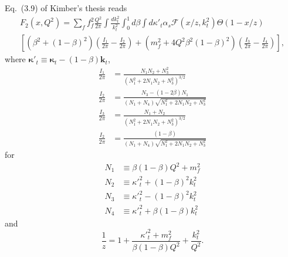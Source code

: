 \documentclass[12pt]{article}
\begin{document}
Eq.~(3.9) of Kimber's thesis reads
\begin{multline}
F_2(x,Q^2)=\sum_f f_f^2 \frac{Q^2}{2\pi}\int\frac{dk^2_t}{k_t^2}\int^1_0d\beta\int d{\kappa'}_t\alpha_s \mathcal{F}(x/z,k_t^2)\Theta(1-x/z)\\
\left[\left(\beta^2+(1-\beta)^2\right)\left(\frac{I_1}{2\pi}-\frac{I_2}{2\pi}\right)
+\left(m_f^2+4Q^2\beta^2(1-\beta)^2\right)\left(\frac{I_3}{2\pi}-\frac{I_4}{2\pi}\right)\right],
\label{eq:angle-integrated}
\end{multline}
where ${\boldsymbol{\kappa}'}_t\equiv{\boldsymbol{\kappa}_t}-(1-\beta)\mathbf{k}_t$, 
\begin{equation}
\begin{split}
\frac{I_1}{2\pi}&=\frac{N_1N_2+N_3^2}{\left( N^2_1+2N_1N_2+N_3^2\right)^{3/2}}\\
\frac{I_2}{2\pi}&=\frac{N_3-(1-2\beta)N_1}{(N_1+N_4)\sqrt{ N^2_1+2N_1N_2+N_3^2}}\\
\frac{I_3}{2\pi}&=\frac{N_1+N_2}{\left( N^2_1+2N_1N_2+N_3^2\right)^{3/2}}\\
\frac{I_2}{2\pi}&=\frac{(1-\beta)}{(N_1+N_4)\sqrt{ N^2_1+2N_1N_2+N_3^2}}
\end{split}
\end{equation}
for
\begin{equation}
\begin{split}
N_1&\equiv\beta(1-\beta)Q^2+m_f^2\\
N_2&\equiv{\kappa'}_t^2+(1-\beta)^2k_t^2\\
N_3&\equiv{\kappa'}_t^2-(1-\beta)^2k_t^2\\
N_4&\equiv{\kappa'}_t^2+\beta(1-\beta)k_t^2
\end{split}
\end{equation}
and
\begin{equation}
\frac{1}{z}=1+\frac{{\kappa'}^2_t+m_f^2}{\beta(1-\beta)Q^2}+\frac{k^2_t}{Q^2}.
\end{equation}
\end{document}
